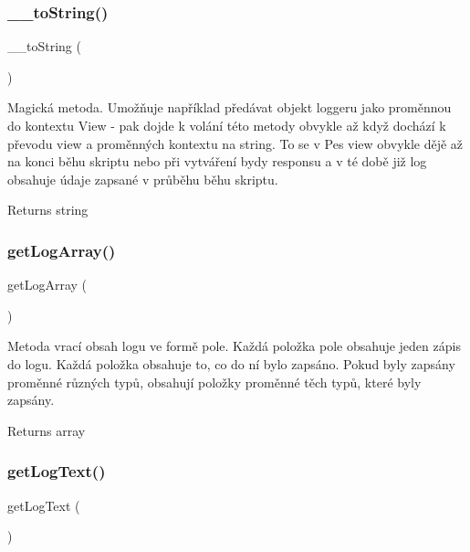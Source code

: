 \subsubsection{\texorpdfstring{\+\_\+\+\_\+to\+String()}{\_\_toString()}}
{\footnotesize\ttfamily \+\_\+\+\_\+to\+String (\begin{DoxyParamCaption}{ }\end{DoxyParamCaption})}

Magická metoda. Umožňuje například předávat objekt loggeru jako proměnnou do kontextu View -\/ pak dojde k volání této metody obvykle až když dochází k převodu view a proměnných kontextu na string. To se v Pes view obvykle dějě až na konci běhu skriptu nebo při vytváření bydy responsu a v té době již log obsahuje údaje zapsané v průběhu běhu skriptu.

\begin{DoxyReturn}{Returns}
string 
\end{DoxyReturn}
\mbox{\label{class_pes_1_1_logger_1_1_array_logger_a755a9b9ee8a5044e162a9fd2a0b2a55c}} 
\subsubsection{\texorpdfstring{get\+Log\+Array()}{getLogArray()}}
{\footnotesize\ttfamily get\+Log\+Array (\begin{DoxyParamCaption}{ }\end{DoxyParamCaption})}

Metoda vrací obsah logu ve formě pole. Každá položka pole obsahuje jeden zápis do logu. Každá položka obsahuje to, co do ní bylo zapsáno. Pokud byly zapsány proměnné různých typů, obsahují položky proměnné těch typů, které byly zapsány. \begin{DoxyReturn}{Returns}
array 
\end{DoxyReturn}
\mbox{\label{class_pes_1_1_logger_1_1_array_logger_af6241fe7e24b92b848c0341d8e134211}} 
\subsubsection{\texorpdfstring{get\+Log\+Text()}{getLogText()}}
{\footnotesize\ttfamily get\+Log\+Text (\begin{DoxyParamCaption}{ }\end{DoxyParamCaption})}

